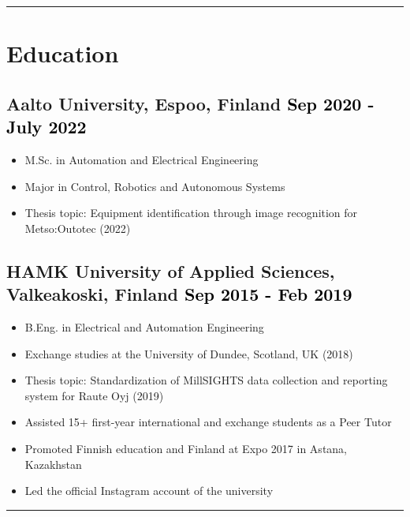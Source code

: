 \documentclass[a4paper,10pt]{article}
\begin{document}
\vspace{0.2cm}
\hrule
\vspace{0.3cm}

\section*{Education}
\subsection*{Aalto University, Espoo, Finland \hfill \textcolor{black}{Sep 2020 - July 2022}}
\begin{itemize}
    \item M.Sc. in Automation and Electrical Engineering
    \item Major in Control, Robotics and Autonomous Systems
    \item Thesis topic: Equipment identification through image recognition for Metso:Outotec (2022)
\end{itemize}

\subsection*{HAMK University of Applied Sciences, Valkeakoski, Finland \hfill \textcolor{black}{Sep 2015 - Feb 2019}}
\begin{itemize}
    \item B.Eng. in Electrical and Automation Engineering
    \item Exchange studies at the University of Dundee, Scotland, UK (2018)
    \item Thesis topic: Standardization of MillSIGHTS data collection and reporting system for Raute Oyj (2019)
    \item Assisted 15+ first-year international and exchange students as a Peer Tutor
    \item Promoted Finnish education and Finland at Expo 2017 in Astana, Kazakhstan
    \item Led the official Instagram account of the university
\end{itemize}

\vspace{0.2cm}
\hrule
\vspace{0.3cm}
\end{document}
